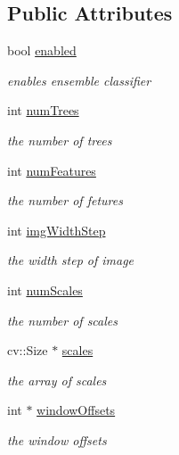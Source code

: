 \subsection*{Public Attributes}
\begin{DoxyCompactItemize}
\item 
bool \hyperlink{classtld_1_1EnsembleClassifier_a539d429a773ec9b2b86946fddb39ac52}{enabled}
\begin{DoxyCompactList}\small\item\em enables ensemble classifier \end{DoxyCompactList}\item 
int \hyperlink{classtld_1_1EnsembleClassifier_a60e802769e79c833d1484d96bb345b7c}{num\-Trees}
\begin{DoxyCompactList}\small\item\em the number of trees \end{DoxyCompactList}\item 
int \hyperlink{classtld_1_1EnsembleClassifier_a176aba4e90f0b9373d8aedd7c25fa262}{num\-Features}
\begin{DoxyCompactList}\small\item\em the number of fetures \end{DoxyCompactList}\item 
int \hyperlink{classtld_1_1EnsembleClassifier_a149e36a3d0d287ee804ec7cf92dc6569}{img\-Width\-Step}
\begin{DoxyCompactList}\small\item\em the width step of image \end{DoxyCompactList}\item 
int \hyperlink{classtld_1_1EnsembleClassifier_ae10dcd7614a39f9b29b3fbe957889fb9}{num\-Scales}
\begin{DoxyCompactList}\small\item\em the number of scales \end{DoxyCompactList}\item 
cv\-::\-Size $\ast$ \hyperlink{classtld_1_1EnsembleClassifier_ae2ea00a933d9c96498ba756a2b4ec6b5}{scales}
\begin{DoxyCompactList}\small\item\em the array of scales \end{DoxyCompactList}\item 
int $\ast$ \hyperlink{classtld_1_1EnsembleClassifier_abc6ed3b991a724b07dfcc25108769e92}{window\-Offsets}
\begin{DoxyCompactList}\small\item\em the window offsets \end{DoxyCompactList}\item 

\end{DoxyCompactItemize}
